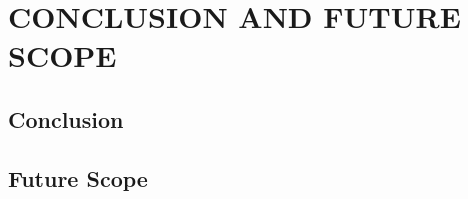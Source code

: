 \chapter{CONCLUSION AND FUTURE SCOPE} \vspace{-15 mm} \hrulefill 
\label{Chapter:5}


\section{Conclusion}

\section{Future Scope}

